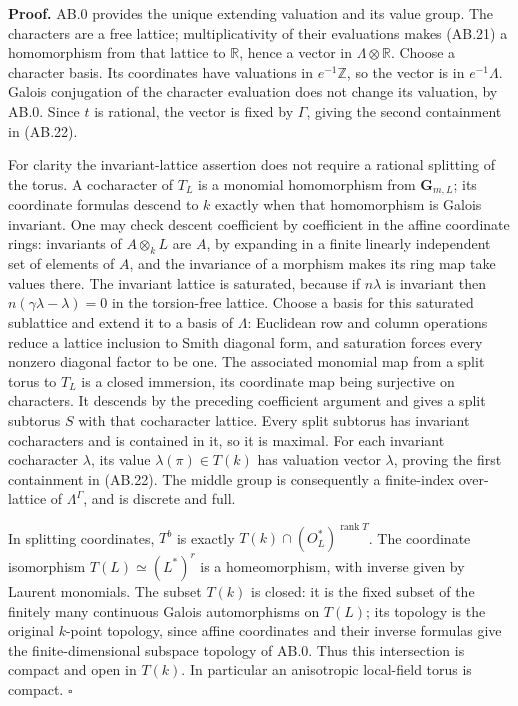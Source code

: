 \documentclass[
  11pt,
]{article}
\begin{document}
\textbf{Proof.} AB.0 provides the unique extending valuation and its
value group. The characters are a free lattice; multiplicativity of
their evaluations makes (AB.21) a homomorphism from that lattice to
\(\mathbb R\), hence a vector in \(\Lambda\otimes\mathbb R\). Choose a
character basis. Its coordinates have valuations in \(e^{-1}\mathbb Z\),
so the vector is in \(e^{-1}\Lambda\). Galois conjugation of the
character evaluation does not change its valuation, by AB.0. Since \(t\)
is rational, the vector is fixed by \(\Gamma\), giving the second
containment in (AB.22).

For clarity the invariant-lattice assertion does not require a rational
splitting of the torus. A cocharacter of \(T_L\) is a monomial
homomorphism from \(\mathbf G_{m,L}\); its coordinate formulas descend
to \(k\) exactly when that homomorphism is Galois invariant. One may
check descent coefficient by coefficient in the affine coordinate rings:
invariants of \(A\otimes_k L\) are \(A\), by expanding in a finite
linearly independent set of elements of \(A\), and the invariance of a
morphism makes its ring map take values there. The invariant lattice is
saturated, because if \(n\lambda\) is invariant then
\(n(\gamma\lambda-\lambda)=0\) in the torsion-free lattice. Choose a
basis for this saturated sublattice and extend it to a basis of
\(\Lambda\): Euclidean row and column operations reduce a lattice
inclusion to Smith diagonal form, and saturation forces every nonzero
diagonal factor to be one. The associated monomial map from a split
torus to \(T_L\) is a closed immersion, its coordinate map being
surjective on characters. It descends by the preceding coefficient
argument and gives a split subtorus \(S\) with that cocharacter lattice.
Every split subtorus has invariant cocharacters and is contained in it,
so it is maximal. For each invariant cocharacter \(\lambda\), its value
\(\lambda(\pi)\in T(k)\) has valuation vector \(\lambda\), proving the
first containment in (AB.22). The middle group is consequently a
finite-index over-lattice of \(\Lambda^\Gamma\), and is discrete and
full.

In splitting coordinates, \(T^b\) is exactly
\(T(k)\cap(O_L^*)^{\operatorname{rank}T}\). The coordinate isomorphism
\(T(L)\simeq(L^*)^r\) is a homeomorphism, with inverse given by Laurent
monomials. The subset \(T(k)\) is closed: it is the fixed subset of the
finitely many continuous Galois automorphisms on \(T(L)\); its topology
is the original \(k\)-point topology, since affine coordinates and their
inverse formulas give the finite-dimensional subspace topology of AB.0.
Thus this intersection is compact and open in \(T(k)\). In particular an
anisotropic local-field torus is compact. \(\square\)
\end{document}
